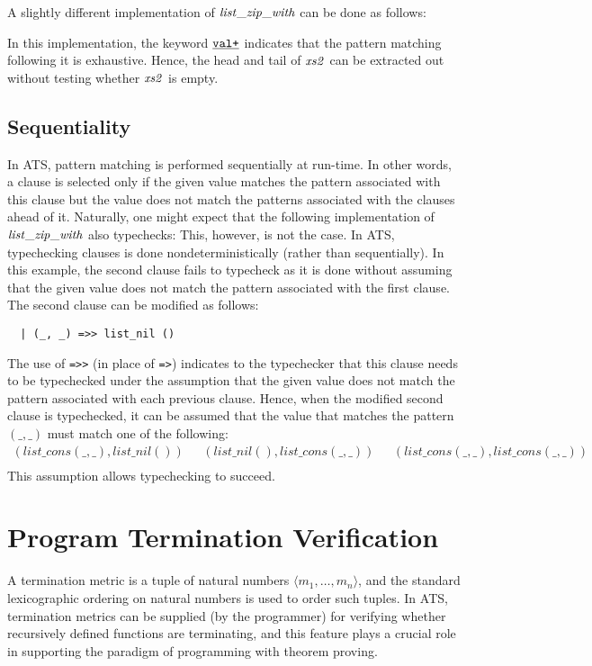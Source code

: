A slightly different implementation of ${\it list\_zip\_with}$ can be
done as follows:

In this implementation, the keyword $\underline{\texttt{val+}}$ indicates that the
pattern matching following it is exhaustive. Hence, the head and tail of
${\it xs2}$ can be extracted out without testing whether ${\it xs2}$ is
empty.

\subsection{Sequentiality}
In ATS, pattern matching is performed sequentially at run-time. In other
words, a clause is selected only if the given value matches the pattern
associated with this clause but the value does not match the patterns
associated with the clauses ahead of it. Naturally, one might expect that
the following implementation of ${\it list\_zip\_with}$ also typechecks:
 This, however, is not the
case. In ATS, typechecking clauses is done nondeterministically (rather
than sequentially). In this example, the second clause fails to typecheck
as it is done without assuming that the given value does not match the
pattern associated with the first clause.  The second clause can be
modified as follows:
\begin{verbatim}
  | (_, _) =>> list_nil ()
\end{verbatim}
The use of \verb`=>>` (in place of \verb`=>`) indicates to the typechecker
that this clause needs to be typechecked under the assumption that the
given value does not match the pattern associated with each previous
clause.  Hence, when the modified second clause is typechecked, it can be
assumed that the value that matches the pattern $(\_, \_)$ must match one
of the following:
$$\begin{array}{lll}
(list\_cons(\_,\_), list\_nil ())~~~& 
(list\_nil (), list\_cons(\_,\_))~~~&
(list\_cons(\_, \_), list\_cons(\_,\_)) \\
\end{array}$$
This assumption allows typechecking to succeed.


\section{Program Termination Verification}
A termination metric is a tuple of natural numbers $\langle
m_1,\ldots,m_n\rangle$, and the standard lexicographic ordering on natural
numbers is used to order such tuples.  In ATS, termination metrics can be
supplied (by the programmer) for verifying whether recursively defined
functions are terminating, and this feature plays a crucial role in
supporting the paradigm of programming with theorem proving.

